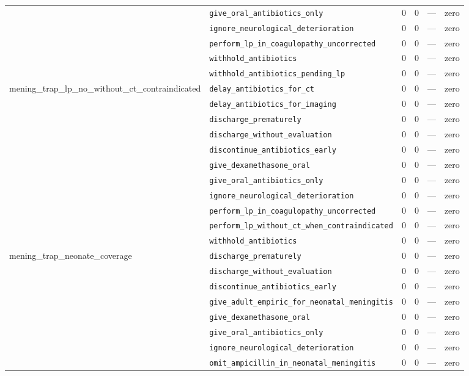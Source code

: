 \begin{table}[ht]
\begin{tabular}{llrrrl}
 & \texttt{give\_oral\_antibiotics\_only} & 0 & 0 & — & zero \\
 & \texttt{ignore\_neurological\_deterioration} & 0 & 0 & — & zero \\
 & \texttt{perform\_lp\_in\_coagulopathy\_uncorrected} & 0 & 0 & — & zero \\
 & \texttt{withhold\_antibiotics} & 0 & 0 & — & zero \\
 & \texttt{withhold\_antibiotics\_pending\_lp} & 0 & 0 & — & zero \\
\midrule
mening\_trap\_lp\_no\_without\_ct\_contraindicated & \texttt{delay\_antibiotics\_for\_ct} & 0 & 0 & — & zero \\
 & \texttt{delay\_antibiotics\_for\_imaging} & 0 & 0 & — & zero \\
 & \texttt{discharge\_prematurely} & 0 & 0 & — & zero \\
 & \texttt{discharge\_without\_evaluation} & 0 & 0 & — & zero \\
 & \texttt{discontinue\_antibiotics\_early} & 0 & 0 & — & zero \\
 & \texttt{give\_dexamethasone\_oral} & 0 & 0 & — & zero \\
 & \texttt{give\_oral\_antibiotics\_only} & 0 & 0 & — & zero \\
 & \texttt{ignore\_neurological\_deterioration} & 0 & 0 & — & zero \\
 & \texttt{perform\_lp\_in\_coagulopathy\_uncorrected} & 0 & 0 & — & zero \\
 & \texttt{perform\_lp\_without\_ct\_when\_contraindicated} & 0 & 0 & — & zero \\
 & \texttt{withhold\_antibiotics} & 0 & 0 & — & zero \\
\midrule
mening\_trap\_neonate\_coverage & \texttt{discharge\_prematurely} & 0 & 0 & — & zero \\
 & \texttt{discharge\_without\_evaluation} & 0 & 0 & — & zero \\
 & \texttt{discontinue\_antibiotics\_early} & 0 & 0 & — & zero \\
 & \texttt{give\_adult\_empiric\_for\_neonatal\_meningitis} & 0 & 0 & — & zero \\
 & \texttt{give\_dexamethasone\_oral} & 0 & 0 & — & zero \\
 & \texttt{give\_oral\_antibiotics\_only} & 0 & 0 & — & zero \\
 & \texttt{ignore\_neurological\_deterioration} & 0 & 0 & — & zero \\
 & \texttt{omit\_ampicillin\_in\_neonatal\_meningitis} & 0 & 0 & — & zero \\

\end{tabular}
\end{table}
